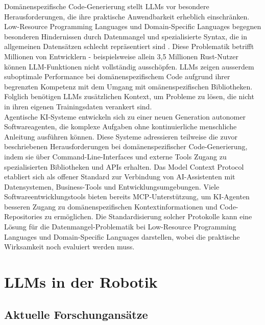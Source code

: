 \noindent
Domänenspezifische Code-Generierung stellt LLMs vor besondere Herausforderungen,
die ihre praktische Anwendbarkeit erheblich einschränken. Low-Resource
Programming Languages und Domain-Specific Languages begegnen besonderen
Hindernissen durch Datenmangel und spezialisierte Syntax, die in allgemeinen
Datensätzen schlecht repräsentiert sind . Diese Problematik
betrifft Millionen von Entwicklern - beispielsweise allein 3,5 Millionen
Rust-Nutzer können LLM-Funktionen nicht vollständig ausschöpfen. LLMs zeigen
ausserdem suboptimale Performance bei domänenspezifischem Code aufgrund ihrer
begrenzten Kompetenz mit dem Umgang mit omänenspezifischen Bibliotheken. 
Folglich benötigen LLMs zusätzlichen Kontext, um Probleme zu lösen, die nicht in
ihren eigenen Trainingsdaten verankert sind.\\

\noindent
Agentische KI-Systeme entwickeln sich zu einer neuen Generation autonomer
Softwareagenten, die komplexe Aufgaben ohne kontinuierliche menschliche
Anleitung ausführen können. Diese Systeme adressieren teilweise die zuvor
beschriebenen Herausforderungen bei domänenspezifischer Code-Generierung, indem
sie über Command-Line-Interfaces und externe Tools Zugang zu spezialisierten
Bibliotheken und APIs erhalten. Das Model Context Protocol etabliert sich als
offener Standard zur Verbindung von AI-Assistenten mit Datensystemen,
Business-Tools und Entwicklungsumgebungen.  Viele Softwareentwicklungstools
bieten bereits MCP-Unterstützung, um KI-Agenten besseren Zugang
zu domänenspezifischen Kontextinformationen und Code-Repositories zu
ermöglichen. Die Standardisierung solcher Protokolle kann eine Lösung für die
Datenmangel-Problematik bei Low-Resource Programming Languages und
Domain-Specific Languages darstellen, wobei die praktische Wirksamkeit noch
evaluiert werden muss.

\section{LLMs in der Robotik}
\subsection{Aktuelle Forschungansätze}

